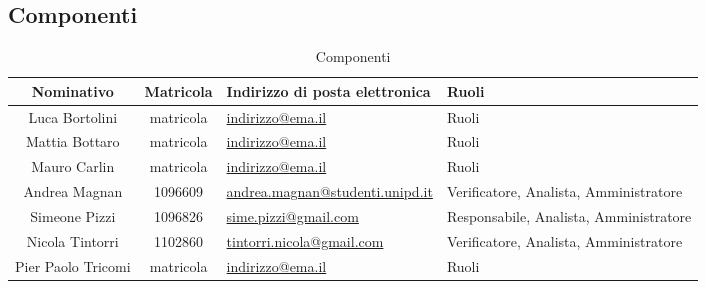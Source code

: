 \documentclass[a4paper,titlepage]{article}
\begin{document}
\subsection{Componenti}
\begin{table}[H]
	\begin{center}
		\setlength{\extrarowheight}{\jot}
		\begin{tabular}{|c|c|p{5cm}|p{4.3cm}|}
			\hline
			\textbf{Nominativo} & \textbf{Matricola} & \raggedright \textbf{Indirizzo di posta elettronica} & \textbf{Ruoli} \\[1ex]
			\hline
	 		Luca Bortolini & matricola	& \href{mailto:indirizzo@ema.il}{indirizzo@ema.il} & Ruoli \\[1ex]
			\hline
			Mattia Bottaro & matricola	& \href{mailto:indirizzo@ema.il}{indirizzo@ema.il} & Ruoli \\[1ex]
			\hline
			Mauro Carlin & matricola	& \href{mailto:indirizzo@ema.il}{indirizzo@ema.il} & Ruoli	\\[1ex]
			\hline
			Andrea Magnan & 1096609 & \href{mailto:andrea.magnan@studenti.unipd.it}{andrea.magnan@studenti.unipd.it} & Verificatore, Analista, Amministratore	\\[1ex]
			\hline
			Simeone Pizzi & 1096826	& \href{mailto:sime.pizzi@gmail.com}{sime.pizzi@gmail.com} 	& Responsabile, Analista, Amministratore 	\\[1ex]
			\hline
			Nicola Tintorri	& 1102860 & \href{mailto:tintorri.nicola@gmail.com}{tintorri.nicola@gmail.com} & Verificatore, Analista, Amministratore 	\\[1ex]
			\hline
			Pier Paolo Tricomi	& matricola	& \href{mailto:indirizzo@ema.il}{indirizzo@ema.il} & Ruoli \\[1ex]
			\hline	
		\end{tabular}
	\end{center}
	\caption{Componenti}
\end{table}
\end{document}
